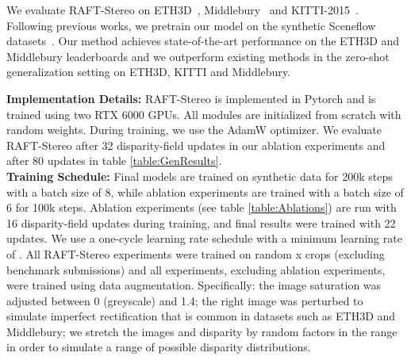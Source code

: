 \documentclass[10pt,twocolumn,letterpaper]{article}
\begin{document}
We evaluate RAFT-Stereo on ETH3D~\cite{eth3d}, Middlebury~\cite{middlebury} and KITTI-2015~\cite{kitti}. Following previous works, we pretrain our model on the synthetic Sceneflow datasets~\cite{sceneflow}. Our method achieves state-of-the-art performance on the ETH3D and Middlebury leaderboards and we outperform existing methods in the zero-shot generalization setting on ETH3D, KITTI and Middlebury. 

\vspace{1mm}
\noindent\textbf{Implementation Details:} RAFT-Stereo is implemented in Pytorch \cite{pytorch} and is trained using two RTX 6000 GPUs. All modules are initialized from scratch with random weights. During training, we use the AdamW \cite{adamw} optimizer. We evaluate RAFT-Stereo after 32 disparity-field updates in our ablation experiments and after 80 updates in table \ref{table:GenResults}. \smallskip\\
\noindent\textbf{Training Schedule:} Final models are trained on synthetic data for 200k steps with a batch size of 8, while ablation experiments are trained with a batch size of 6 for 100k steps. Ablation experiments (see table \ref{table:Ablations}) are run with 16 disparity-field updates during training, and final results were trained with 22 updates. We use a one-cycle learning rate schedule \cite{smith2018superconvergence} with a minimum learning rate of . All RAFT-Stereo experiments were trained on random x crops (excluding benchmark submissions) and all experiments, excluding ablation experiments, were trained using data augmentation. Specifically: the image saturation was adjusted between 0 (greyscale) and 1.4; the right image was perturbed to simulate imperfect rectification that is common in datasets such as ETH3D and Middlebury; we stretch the images and disparity by random factors in the range  in order to simulate a range of possible disparity distributions. 
\end{document}
